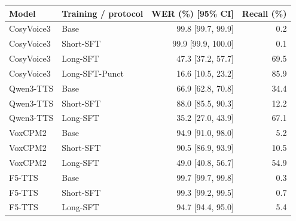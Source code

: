 \begin{tabular}{llrr}
\toprule
Model & Training / protocol & WER (\%) [95\% CI] & Recall (\%) \\
\midrule
CosyVoice3 & Base & 99.8 [99.7, 99.9] & 0.2 \\
CosyVoice3 & Short-SFT & 99.9 [99.9, 100.0] & 0.1 \\
CosyVoice3 & Long-SFT & 47.3 [37.2, 57.7] & 69.5 \\
CosyVoice3 & Long-SFT-Punct & 16.6 [10.5, 23.2] & 85.9 \\
Qwen3-TTS & Base & 66.9 [62.8, 70.8] & 34.4 \\
Qwen3-TTS & Short-SFT & 88.0 [85.5, 90.3] & 12.2 \\
Qwen3-TTS & Long-SFT & 35.2 [27.0, 43.9] & 67.1 \\
VoxCPM2 & Base & 94.9 [91.0, 98.0] & 5.2 \\
VoxCPM2 & Short-SFT & 90.5 [86.9, 93.9] & 10.5 \\
VoxCPM2 & Long-SFT & 49.0 [40.8, 56.7] & 54.9 \\
F5-TTS & Base & 99.7 [99.7, 99.8] & 0.3 \\
F5-TTS & Short-SFT & 99.3 [99.2, 99.5] & 0.7 \\
F5-TTS & Long-SFT & 94.7 [94.4, 95.0] & 5.4 \\
\bottomrule
\end{tabular}
